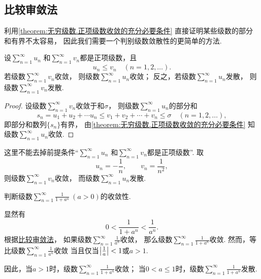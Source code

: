 \subsection{比较审敛法}
利用\cref{theorem:无穷级数.正项级数收敛的充分必要条件} 直接证明某些级数的部分和有界不太容易，
因此我们需要一个判别级数敛散性的更简单的方法.

\begin{theorem}[比较审敛法]\label{theorem:无穷级数.正项级数的比较审敛法}
设\(\sum_{n=1}^\infty u_n\)
和\(\sum_{n=1}^\infty v_n\)都是正项级数，且\[
	u_n \leq v_n
	\quad(n=1,2,\dotsc).
\]
若级数\(\sum_{n=1}^\infty v_n\)收敛，
则级数\(\sum_{n=1}^\infty u_n\)收敛；
反之，若级数\(\sum_{n=1}^\infty u_n\)发散，
则级数\(\sum_{n=1}^\infty v_n\)发散.
\begin{proof}
设级数\(\sum_{n=1}^\infty v_n\)收敛于和\(\sigma\)，
则级数\(\sum_{n=1}^\infty u_n\)的部分和\[
	s_n = u_1 + u_2 + \dotsb u_n
	\leq
	v_1 + v_2 + \dotsb + v_n \leq \sigma
	\quad(n=1,2,\dotsc),
\]
即部分和数列\(\{s_n\}\)有界，
由\cref{theorem:无穷级数.正项级数收敛的充分必要条件} 知级数\(\sum_{n=1}^\infty u_n\)收敛.
\end{proof}
\end{theorem}
\begin{remark}
这里不能去掉前提条件“\(\sum_{n=1}^\infty u_n\)
和\(\sum_{n=1}^\infty v_n\)都是正项级数”.
取\[
	u_n = -\frac1n,
	\qquad
	v_n = \frac1{n^2},
\]
则级数\(\sum_{n=1}^\infty v_n\)收敛，
而级数\(\sum_{n=1}^\infty u_n\)发散.
\end{remark}

\begin{example}
判断级数\(\sum_{n=1}^\infty \frac{1}{1+a^n}\ (a>0)\)的收敛性.
\begin{solution}
显然有\[
	0 < \frac{1}{1+a^n} < \frac{1}{a^n}.
\]
根据\hyperref[theorem:无穷级数.正项级数的比较审敛法]{比较审敛法}，
如果级数\(\sum_{n=1}^\infty \frac{1}{a^n}\)收敛，
那么级数\(\sum_{n=1}^\infty \frac{1}{1+a^n}\)收敛.
然而，等比级数\(\sum_{n=1}^\infty \frac{1}{a^n}\)收敛
当且仅当\(\abs{\frac{1}{a}} < 1\)或\(a > 1\).

因此，当\(a > 1\)时，级数\(\sum_{n=1}^\infty \frac{1}{1+a^n}\)收敛；
当\(0 < a \leq 1\)时，级数\(\sum_{n=1}^\infty \frac{1}{1+a^n}\)发散.
\end{solution}
\end{example}

